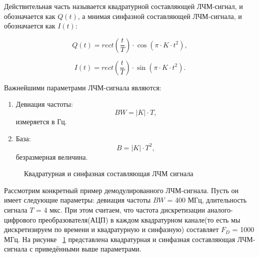 Действительная часть называется квадратурной
составляющей ЛЧМ-сигнал, и обозначается как \(Q(t)\), а мнимая 
синфазной составляющей ЛЧМ-сигнала, и обозначается как \(I(t)\):

\begin{equation}	
	Q(t) = rect(\frac{t}{T}) \cdot \cos(\pi \cdot K \cdot t^{2}),
\end{equation}

\begin{equation}	
	I(t) = rect(\frac{t}{T}) \cdot \sin(\pi \cdot K \cdot t^{2}).
\end{equation}

Важнейшими параметрами ЛЧМ-сигнала являются:

\begin{enumerate}
	\item Девиация частоты: 
\begin{equation}
	BW = |K| \cdot T, 
\end{equation}
измеряется в Гц.
	\item База: 
\begin{equation}
	B = |K| \cdot T^2, 
\end{equation}
безразмерная величина.
\end{enumerate}

\begin{figure}[h]
    \centering
    \noindent
    \caption{Квадратурная и синфазная составляющая ЛЧМ сигнала}
    \label{fig:chirp}
\end{figure}

Рассмотрим конкретный пример демодулированного ЛЧМ-сигнала. Пусть он имеет следующие параметры: девиация частоты \(BW\) = 400 МГц, длительность сигнала \(T\) = 4 мкс. При этом считаем, что частота дискретизации аналого-цифрового преобразователя(АЦП) в каждом квадратурном канале(то есть мы дискретизируем по времени и квадратурную и синфазную) составляет \(F_{D}\) = 1000 МГц. На рисунке ~\ref{fig:chirp} представлена квадратурная и синфазная составляющая ЛЧМ-сигнала с приведёнными выше параметрами.

